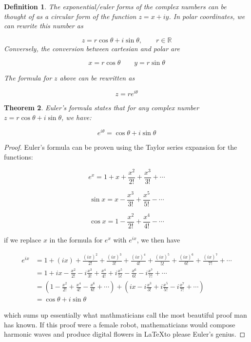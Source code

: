 \documentclass[12pt]{article}
\theoremstyle{plain}
\newtheorem{theorem}{Theorem}[section]
\newtheorem{definition}[theorem]{Definition}
\theoremstyle{definition}
\begin{document}
\begin{definition}
    The exponential/euler forms of the complex numbers can be thought of as a circular form of the function $z = x + iy$. In polar coordinates, we can rewrite this number as 

    $$
        z = r \cos \theta + i \sin \theta, \qquad r \in \mathbb{R}
    $$
    Conversely, the conversion between cartesian and polar are 
    
    $$
    x = r \cos \theta \qquad y = r \sin \theta
    $$
    
    The formula for $z$ above can be rewritten as 

    $$z = r e^{i\theta}$$
\end{definition}


\begin{theorem}
    Euler's formula states that for any complex number $z = r \cos \theta + i \sin \theta$, we have:

    $$
    e^{i \theta} = \cos \theta + i \sin \theta
    $$
\end{theorem}

\begin{proof}
    Euler's formula can be proven using the Taylor series expansion for the functions:

    \[
    e^x = 1 + x + \frac{x^2}{2!} + \frac{x^3}{3!} + \cdots
    \]

    \[
    \sin x = x - \frac{x^3}{3!} + \frac{x^5}{5!} - \cdots
    \]

    \[
    \cos x = 1 - \frac{x^2}{2!} + \frac{x^4}{4!} - \cdots
    \]

    if we replace $x$ in the formula for $e^x$ with $e^{ix}$, we then have 

    \begin{align*}
    e^{ix} &= 1 + (ix) + \frac{(ix)^2}{2!} + \frac{(ix)^3}{3!} + \frac{(ix)^4}{4!} + \frac{(ix)^5}{5!} + \frac{(ix)^6}{6!} + \frac{(ix)^7}{7!} + \cdots \\
    &= 1 + i x - \frac{x^2}{2!} - i \frac{x^3}{3!} + \frac{x^4}{4!} + i \frac{x^5}{5!} - \frac{x^6}{6!} - i \frac{x^7}{7!} + \cdots \\
    &= \left(1 - \frac{x^2}{2!} + \frac{x^4}{4!} - \frac{x^6}{6!} + \cdots \right) + \left(i x - i \frac{x^3}{3!} + i \frac{x^5}{5!}- i \frac{x^7}{7!} + \cdots\right) \\
    &= \cos \theta + i \sin \theta
    \end{align*}

    which sums up essentially what mathmaticians call the most beautiful proof man has known. If this proof were a female robot, mathematicians would compose harmonic waves and produce digital flowers in \LaTeX to please Euler's genius. 
\end{proof}
\end{document}
